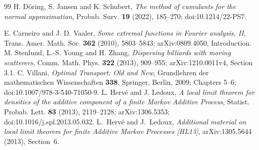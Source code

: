 \begin{thebibliography}{99}
 H. D\"oring, S. Jansen and K. Schubert,
\emph{The method of cumulants for the normal approximation},
Probab. Surv. \textbf{19} (2022), 185--270; doi:10.1214/22-PS7.

 E. Carneiro and J. D. Vaaler,
\emph{Some extremal functions in Fourier analysis, II},
Trans. Amer. Math. Soc. \textbf{362} (2010), 5803--5843;
arXiv:0809.4050, Introduction.
 M. Stenlund, L.-S. Young and H. Zhang,
\emph{Dispersing billiards with moving scatterers},
Comm. Math. Phys. \textbf{322} (2013), 909--955;
arXiv:1210.0011v4, Section 3.1.
 C. Villani, \emph{Optimal Transport: Old and New},
Grundlehren der mathematischen Wissenschaften \textbf{338}, Springer,
Berlin, 2009; Chapters 5--6; doi:10.1007/978-3-540-71050-9.
 L. Herv\'e and J. Ledoux,
\emph{A local limit theorem for densities of the additive component of a
finite Markov Additive Process}, Statist. Probab. Lett. \textbf{83}
(2013), 2119--2128; arXiv:1306.5353; doi:10.1016/j.spl.2013.05.032.
L.~Herv\'e and J.~Ledoux,
\emph{Additional material on local limit theorem for finite Additive
Markov Processes [HL13]}, arXiv:1305.5644 (2013), Section~6.
\end{thebibliography}
